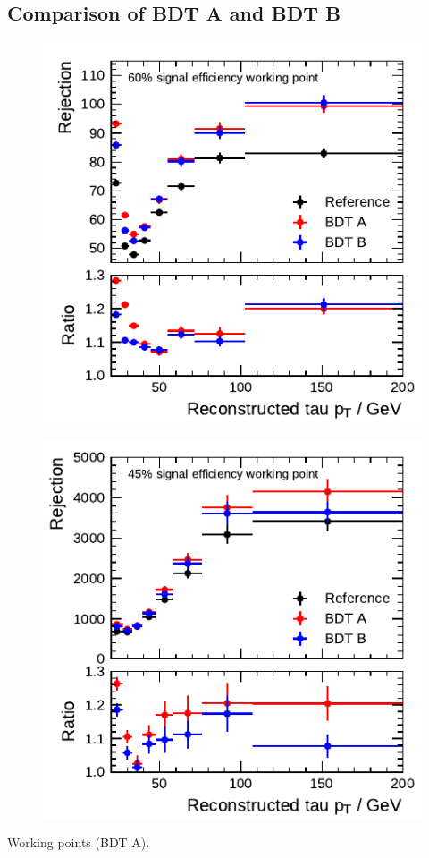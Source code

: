 \FloatBarrier
\subsection{Comparison of BDT A and BDT B}

\noindent
\begin{minipage}{\textwidth}
  \captionsetup{type=figure}
  \begin{subfigure}[t]{0.48\textwidth}
    \centering
    \includegraphics{./figures/bdt_perf/rejection/post_gridsearch_1p/rejection_tight.pdf}
  \end{subfigure}\hfill
  \begin{subfigure}[t]{0.48\textwidth}
    \centering
    \includegraphics{./figures/bdt_perf/rejection/post_gridsearch_3p/rejection_tight.pdf}
  \end{subfigure}
  \caption{Working points (BDT A).}
\end{minipage}

